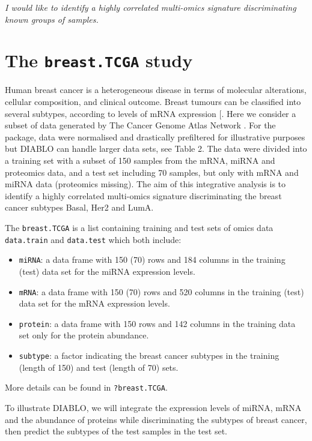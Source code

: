 \documentclass[]{book}
\begin{document}
{
\emph{I would like to identify a highly correlated multi-omics signature discriminating known groups of samples.}
}

\hypertarget{the-breast.tcga-study}{%
\section{\texorpdfstring{The \texttt{breast.TCGA} study}{The breast.TCGA study}}\label{the-breast.tcga-study}}

Human breast cancer is a heterogeneous disease in terms of molecular alterations, cellular composition, and clinical outcome. Breast tumours can be classified into several subtypes, according to levels of mRNA expression {[}\citet{Sor01}. Here we consider a subset of data generated by The Cancer Genome Atlas Network \citep{TCGA12}. For the package, data were normalised and drastically prefiltered for illustrative purposes but DIABLO can handle larger data sets, see \citep{mixomics} Table 2.
The data were divided into a training set with a subset of 150 samples from the mRNA, miRNA and proteomics data, and a test set including 70 samples, but only with mRNA and miRNA data (proteomics missing). The aim of this integrative analysis is to identify a highly correlated multi-omics signature discriminating the breast cancer subtypes Basal, Her2 and LumA.

The \texttt{breast.TCGA} is a list containing training and test sets of omics data \texttt{data.train} and \texttt{data.test} which both include:

\begin{itemize}
\item
  \texttt{miRNA}: a data frame with 150 (70) rows and 184 columns in the training (test) data set for the miRNA expression levels.
\item
  \texttt{mRNA}: a data frame with 150 (70) rows and 520 columns in the training (test) data set for the mRNA expression levels.
\item
  \texttt{protein}: a data frame with 150 rows and 142 columns in the training data set only for the protein abundance.
\item
  \texttt{subtype}: a factor indicating the breast cancer subtypes in the training (length of 150) and test (length of 70) sets.
\end{itemize}

More details can be found in \texttt{?breast.TCGA}.

To illustrate DIABLO, we will integrate the expression levels of miRNA, mRNA and the abundance of proteins while discriminating the subtypes of breast cancer, then predict the subtypes of the test samples in the test set.
\end{document}
